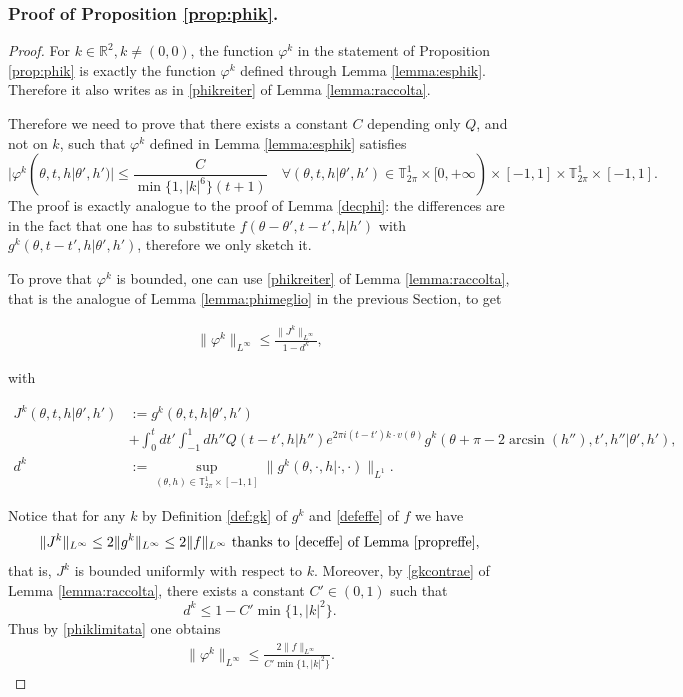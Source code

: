 \documentclass[a4paper,10pt,reqno]{amsart}
\numberwithin{equation}{subsection}
\numberwithin{figure}{subsection}
\begin{document}
\subsubsection{Proof of Proposition \ref{prop:phik}.}
\begin{proof} For $k\in\mathbb{R}^2,k\neq(0,0)$, the function $\varphi^k$ in the statement of Proposition \ref{prop:phik} is exactly the function $\varphi^k$ defined through Lemma \ref{lemma:esphik}. Therefore it also writes as in \eqref{phikreiter} of Lemma \ref{lemma:raccolta}.

Therefore we need to prove that there exists a constant $C$ depending only $Q$, and not on $k$, such that $\varphi^k$ defined in Lemma \ref{lemma:esphik} satisfies
{\footnotesize\[
|\varphi^k(\theta,t,h|\theta',h')|\leq\frac{C}{\min\{1,|k|^6\}(t+1)}\quad\forall(\theta,t,h|\theta',h')\in\mathbb{T}^1_{2\pi}\times[0,+\infty)\times[-1,1]\times\mathbb{T}^1_{2\pi}\times[-1,1].
\]}
The proof is exactly analogue to the proof of Lemma \ref{decphi}: the differences are in the fact that one has to substitute $f(\theta-\theta',t-t',h|h')$ with $g^k(\theta,t-t',h|\theta',h')$, therefore we only sketch it.

To prove that $\varphi^k$ is bounded, one can use \eqref{phikreiter} of Lemma \ref{lemma:raccolta}, that is the analogue of Lemma \ref{lemma:phimeglio} in the previous Section, to get

\begin{align}\label{phiklimitata}
\|\varphi^k\|_{L^{\infty}}\leq\frac{\|J^k\|_{L^{\infty}}}{1-d^k},
\end{align}

with

{\footnotesize\begin{align*}
J^k(\theta,t,h|\theta',h')&:=g^k(\theta,t,h|\theta',h')
\\
&+\int_0^tdt'\int_{-1}^1dh''Q(t-t',h|h'')e^{2\pi i(t-t')k\cdot v(\theta)}g^k(\theta+\pi-2\arcsin(h''),t',h''|\theta',h'),
\\
d^k&:=\sup_{(\theta,h)\in\mathbb{T}^1_{2\pi}\times[-1,1]}\|g^k(\theta,\cdot,h|\cdot,\cdot)\|_{L^1}.
\end{align*}}

Notice that for any $k$ by Definition \ref{def:gk} of $g^k$ and \ref{defeffe} of $f$ we have
\[
\|J^k\|_{L^{\infty}}\leq2\|g^k\|_{L^{\infty}}\leq2\|f\|_{L^{\infty}}\textrm{ thanks to \eqref{deceffe} of Lemma \ref{propreffe}},
\]
that is, $J^k$ is bounded uniformly with respect to $k$. Moreover, by \eqref{gkcontrae} of Lemma \ref{lemma:raccolta}, there exists a constant $C'\in(0,1)$ such that
\[
d^k\leq1-C'\min\{1,|k|^2\}.
\]
Thus by \eqref{phiklimitata} one obtains
\begin{align}\label{phiklimitata2}
\|\varphi^k\|_{L^{\infty}}\leq\frac{2\|f\|_{L^{\infty}}}{C'\min\{1,|k|^2\}}.
\end{align}


\end{proof}
\end{document}
